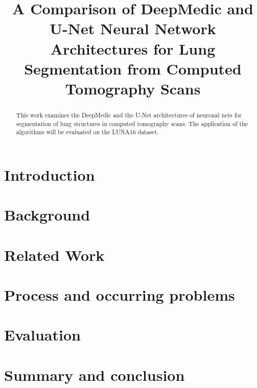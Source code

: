 \documentclass[conference]{IEEEtran}
\begin{document}
\title{A Comparison of DeepMedic and U-Net Neural Network Architectures for Lung Segmentation from Computed Tomography Scans}

\author{
	\and
	\and
	\and
}


\maketitle

\begin{abstract}
This work examines the DeepMedic and the U-Net architectures of neuronal nets for segmentation of lung structures in computed tomography scans. The application of the algorithms will be evaluated on the LUNA16 dataset.
\end{abstract}

\section{Introduction}



\section{Background}


\section{Related Work}


\section{Process and occurring problems}


\section{Evaluation}


\section{Summary and conclusion}




\end{document}
